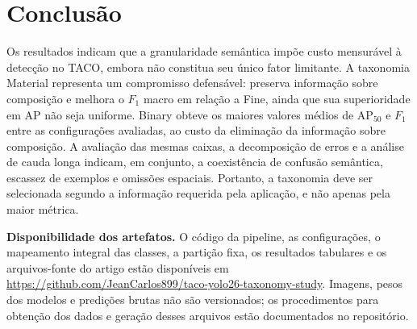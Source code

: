 \section{Conclusão}

Os resultados indicam que a granularidade semântica impõe custo mensurável à detecção no TACO, embora não constitua seu único fator limitante. A taxonomia Material representa um compromisso defensável: preserva informação sobre composição e melhora o $F_1$ macro em relação a Fine, ainda que sua superioridade em AP não seja uniforme. Binary obteve os maiores valores médios de AP$_{50}$ e $F_1$ entre as configurações avaliadas, ao custo da eliminação da informação sobre composição. A avaliação das mesmas caixas, a decomposição de erros e a análise de cauda longa indicam, em conjunto, a coexistência de confusão semântica, escassez de exemplos e omissões espaciais. Portanto, a taxonomia deve ser selecionada segundo a informação requerida pela aplicação, e não apenas pela maior métrica.

\noindent\textbf{Disponibilidade dos artefatos.} O código da pipeline, as configurações, o mapeamento integral das classes, a partição fixa, os resultados tabulares e os arquivos-fonte do artigo estão disponíveis em \url{https://github.com/JeanCarlos899/taco-yolo26-taxonomy-study}. Imagens, pesos dos modelos e predições brutas não são versionados; os procedimentos para obtenção dos dados e geração desses arquivos estão documentados no repositório.
